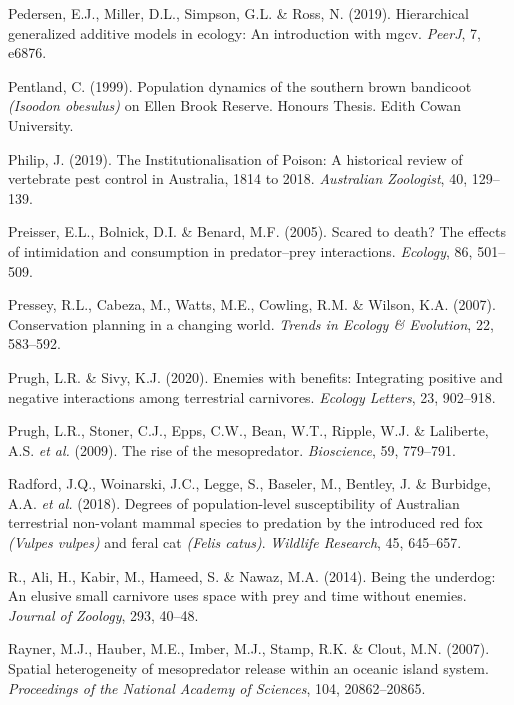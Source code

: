 \documentclass[11pt,a4paper,titlepage,twoside,openright]{style/unimelbthesis}
\begin{document}
\begin{mainmatter}
\leavevmode\hypertarget{ref-pedersen2019hierarchical}{}%
Pedersen, E.J., Miller, D.L., Simpson, G.L. \& Ross, N. (2019). Hierarchical generalized additive models in ecology: An introduction with mgcv. \emph{PeerJ}, 7, e6876.

\leavevmode\hypertarget{ref-pentland1999population}{}%
Pentland, C. (1999). Population dynamics of the southern brown bandicoot \emph{(Isoodon obesulus)} on Ellen Brook Reserve. Honours Thesis. Edith Cowan University.

\leavevmode\hypertarget{ref-philip2019institutionalisation}{}%
Philip, J. (2019). The Institutionalisation of Poison: A historical review of vertebrate pest control in Australia, 1814 to 2018. \emph{Australian Zoologist}, 40, 129--139.

\leavevmode\hypertarget{ref-preisser2005scared}{}%
Preisser, E.L., Bolnick, D.I. \& Benard, M.F. (2005). Scared to death? The effects of intimidation and consumption in predator--prey interactions. \emph{Ecology}, 86, 501--509.

\leavevmode\hypertarget{ref-pressey2007conservation}{}%
Pressey, R.L., Cabeza, M., Watts, M.E., Cowling, R.M. \& Wilson, K.A. (2007). Conservation planning in a changing world. \emph{Trends in Ecology \& Evolution}, 22, 583--592.

\leavevmode\hypertarget{ref-prugh2020enemies}{}%
Prugh, L.R. \& Sivy, K.J. (2020). Enemies with benefits: Integrating positive and negative interactions among terrestrial carnivores. \emph{Ecology Letters}, 23, 902--918.

\leavevmode\hypertarget{ref-prugh2009rise}{}%
Prugh, L.R., Stoner, C.J., Epps, C.W., Bean, W.T., Ripple, W.J. \& Laliberte, A.S. \emph{et al.} (2009). The rise of the mesopredator. \emph{Bioscience}, 59, 779--791.

\leavevmode\hypertarget{ref-radford2018degrees}{}%
Radford, J.Q., Woinarski, J.C., Legge, S., Baseler, M., Bentley, J. \& Burbidge, A.A. \emph{et al.} (2018). Degrees of population-level susceptibility of Australian terrestrial non-volant mammal species to predation by the introduced red fox \emph{(Vulpes vulpes)} and feral cat \emph{(Felis catus)}. \emph{Wildlife Research}, 45, 645--657.

\leavevmode\hypertarget{ref-bischof2014being}{}%
R., Ali, H., Kabir, M., Hameed, S. \& Nawaz, M.A. (2014). Being the underdog: An elusive small carnivore uses space with prey and time without enemies. \emph{Journal of Zoology}, 293, 40--48.

\leavevmode\hypertarget{ref-rayner2007spatial}{}%
Rayner, M.J., Hauber, M.E., Imber, M.J., Stamp, R.K. \& Clout, M.N. (2007). Spatial heterogeneity of mesopredator release within an oceanic island system. \emph{Proceedings of the National Academy of Sciences}, 104, 20862--20865.


\end{mainmatter}
\end{document}
